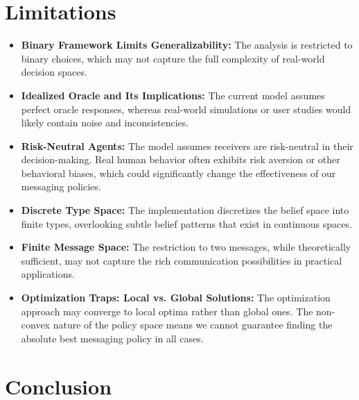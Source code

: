 \documentclass[12pt]{article}
\theoremstyle{plain}
\theoremstyle{definition}
\theoremstyle{remark}
\begin{document}
\section{Limitations}

\begin{itemize}
    \item \textbf{Binary Framework Limits Generalizability:} The analysis is restricted to binary choices, which may not capture the full complexity of real-world decision spaces.
    
    \item \textbf{Idealized Oracle and Its Implications:} The current model assumes perfect oracle responses, whereas real-world simulations or user studies would likely contain noise and inconsistencies.
    
    \item \textbf{Risk-Neutral Agents:} The model assumes receivers are risk-neutral in their decision-making. Real human behavior often exhibits risk aversion or other behavioral biases, which could significantly change the effectiveness of our messaging policies.
    
    \item \textbf{Discrete Type Space:} The implementation discretizes the belief space into finite types, overlooking subtle belief patterns that exist in continuous spaces.
    
    \item \textbf{Finite Message Space:} The restriction to two messages, while theoretically sufficient, may not capture the rich communication possibilities in practical applications.
    
    \item \textbf{Optimization Traps: Local vs. Global Solutions:} The optimization approach may converge to local optima rather than global ones. The non-convex nature of the policy space means we cannot guarantee finding the absolute best messaging policy in all cases.
\end{itemize}

\section{Conclusion}
\end{document}

